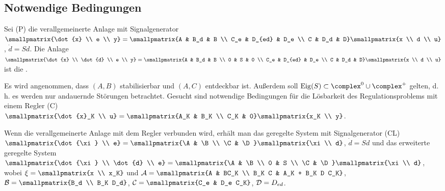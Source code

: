 \subsection{%
    Notwendige Bedingungen%
}

Sei (P) die verallgemeinerte Anlage mit Signalgenerator\\
$\smallpmatrix{\dot{x} \\ e \\ y} = \smallpmatrix{A & B_d & B \\ C_e & D_{ed} & D_e \\ C & D_d & D}
\smallpmatrix{x \\ d \\ u}$, $\dot{d} = Sd$.
Die Anlage
$\smallpmatrix{\dot{x} \\ \dot{d} \\ e \\ y} =
\smallpmatrix{A & B_d & B \\ 0 & S & 0 \\ C_e & D_{ed} & D_e \\ C & D_d & D}
\smallpmatrix{x \\ d \\ u}$
ist die .

Es wird angenommen, dass $(A, B)$ stabilisierbar und $(A, C)$ entdeckbar ist.
Außerdem soll $\Eig(S) \subset \complex^0 \cup \complex^+$ gelten, d.\,h. es werden nur
andauernde Störungen betrachtet.
Gesucht sind notwendige Bedingungen für die Lösbarkeit des Regulationsproblems mit einem
Regler (C)\\
$\smallpmatrix{\dot{x}_K \\ u} = \smallpmatrix{A_K & B_K \\ C_K & 0} \smallpmatrix{x_K \\ y}$.

Wenn die verallgemeinerte Anlage mit dem Regler verbunden wird,
erhält man das geregelte System
mit Signalgenerator (CL)\\
$\smallpmatrix{\dot{\xi} \\ e} = \smallpmatrix{\A & \B \\ \C & \D} \smallpmatrix{\xi \\ d}$,
$\dot{d} = Sd$
und das erweiterte geregelte System
$\smallpmatrix{\dot{\xi} \\ \dot{d} \\ e} = \smallpmatrix{\A & \B \\ 0 & S \\ \C & \D}
\smallpmatrix{\xi \\ d}$,\\
wobei $\xi = \smallpmatrix{x \\ x_K}$ und
$\A = \smallpmatrix{A & BC_K \\ B_K C & A_K + B_K D C_K}$,
$\B = \smallpmatrix{B_d \\ B_K D_d}$,
$\C = \smallpmatrix{C_e & D_e C_K}$,
$\mathcal{D} = D_{ed}$.

